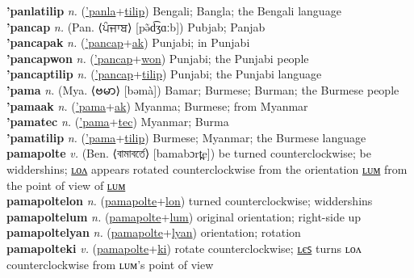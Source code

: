 \textbf{'panlatilip} \textit{n.} (\hyperref['panla]{'panla}+\hyperref[tilip]{tilip})
Bengali; Bangla; the Bengali language \label{'panlatilip} \\
\textbf{'pancap} \textit{n.} (Pan. ⟨ਪੰਜਾਬ⟩ [pə̃d͡ʒɑːb])
Pubjab; Panjab \label{'pancap} \\
\textbf{'pancapak} \textit{n.} (\hyperref['pancap]{'pancap}+\hyperref[ak]{ak})
Punjabi; in Punjabi \label{'pancapak} \\
\textbf{'pancapwon} \textit{n.} (\hyperref['pancap]{'pancap}+\hyperref[won]{won})
Punjabi; the Punjabi people \label{'pancapwon} \\
\textbf{'pancaptilip} \textit{n.} (\hyperref['pancap]{'pancap}+\hyperref[tilip]{tilip})
Punjabi; the Punjabi language \label{'pancaptilip} \\
\textbf{'pama} \textit{n.} (Mya. ⟨ဗမာ⟩ [bəmà])
Bamar; Burmese; Burman; the Burmese people \label{'pama} \\
\textbf{'pamaak} \textit{n.} (\hyperref['pama]{'pama}+\hyperref[ak]{ak})
Myanma; Burmese; from Myanmar \label{'pamaak} \\
\textbf{'pamatec} \textit{n.} (\hyperref['pama]{'pama}+\hyperref[tec]{tec})
Myanmar; Burma \label{'pamatec} \\
\textbf{'pamatilip} \textit{n.} (\hyperref['pama]{'pama}+\hyperref[tilip]{tilip})
Burmese; Myanmar; the Burmese language \label{'pamatilip} \\
\textbf{pamapolte} \textit{v.} (Ben. ⟨বামাবর্তে⟩ [bamabɔrt̪e])
be turned counterclockwise; be widdershins; \hyperref[pamapoltelon]{ʟᴏᴧ} appears rotated counterclockwise from the orientation \hyperref[pamapoltelum]{ʟᴜᴍ} from the point of view of \hyperref[pamapoltelum]{ʟᴜᴍ} \label{pamapolte} \\
\textbf{pamapoltelon} \textit{n.} (\hyperref[pamapolte]{pamapolte}+\hyperref[lon]{lon})
turned counterclockwise; widdershins \label{pamapoltelon} \\
\textbf{pamapoltelum} \textit{n.} (\hyperref[pamapolte]{pamapolte}+\hyperref[lum]{lum})
original orientation; right-side up \label{pamapoltelum} \\
\textbf{pamapoltelyan} \textit{n.} (\hyperref[pamapolte]{pamapolte}+\hyperref[lyan]{lyan})
orientation; rotation \label{pamapoltelyan} \\
\textbf{pamapolteki} \textit{v.} (\hyperref[pamapolte]{pamapolte}+\hyperref[ki]{ki})
rotate counterclockwise; \hyperref[pamapoltekiles]{ʟєꜱ} turns ʟᴏᴧ counterclockwise from ʟᴜᴍ’s point of view \label{pamapolteki} \\

